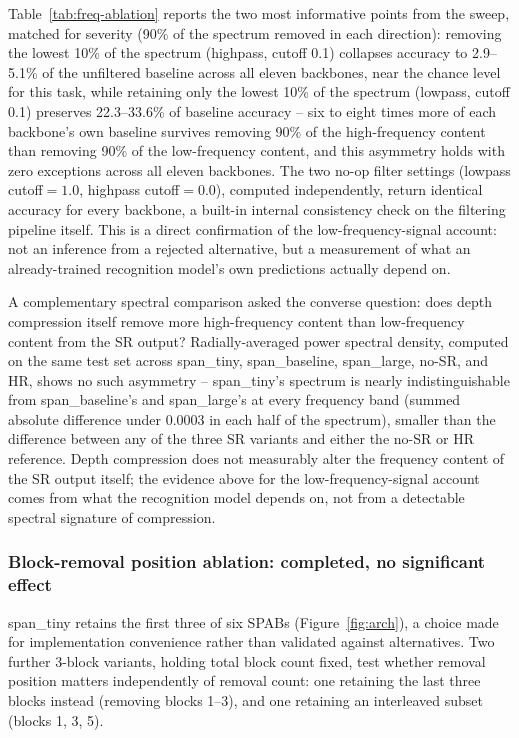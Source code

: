 \documentclass[11pt]{article}
\begin{document}
Table~\ref{tab:freq-ablation} reports the two most informative points from the sweep, matched for severity (90\% of the spectrum removed in each direction): removing the lowest 10\% of the spectrum (highpass, cutoff 0.1) collapses accuracy to 2.9--5.1\% of the unfiltered baseline across all eleven backbones, near the chance level for this task, while retaining only the lowest 10\% of the spectrum (lowpass, cutoff 0.1) preserves 22.3--33.6\% of baseline accuracy -- six to eight times more of each backbone's own baseline survives removing 90\% of the high-frequency content than removing 90\% of the low-frequency content, and this asymmetry holds with zero exceptions across all eleven backbones. The two no-op filter settings (lowpass cutoff$=1.0$, highpass cutoff$=0.0$), computed independently, return identical accuracy for every backbone, a built-in internal consistency check on the filtering pipeline itself. This is a direct confirmation of the low-frequency-signal account: not an inference from a rejected alternative, but a measurement of what an already-trained recognition model's own predictions actually depend on.

A complementary spectral comparison asked the converse question: does depth compression itself remove more high-frequency content than low-frequency content from the SR output? Radially-averaged power spectral density, computed on the same test set across span\_tiny, span\_baseline, span\_large, no-SR, and HR, shows no such asymmetry -- span\_tiny's spectrum is nearly indistinguishable from span\_baseline's and span\_large's at every frequency band (summed absolute difference under 0.0003 in each half of the spectrum), smaller than the difference between any of the three SR variants and either the no-SR or HR reference. Depth compression does not measurably alter the frequency content of the SR output itself; the evidence above for the low-frequency-signal account comes from what the recognition model depends on, not from a detectable spectral signature of compression.

\subsubsection{Block-removal position ablation: completed, no significant effect}

span\_tiny retains the first three of six SPABs (Figure~\ref{fig:arch}), a choice made for implementation convenience rather than validated against alternatives. Two further 3-block variants, holding total block count fixed, test whether removal position matters independently of removal count: one retaining the last three blocks instead (removing blocks 1--3), and one retaining an interleaved subset (blocks 1, 3, 5).
\end{document}
